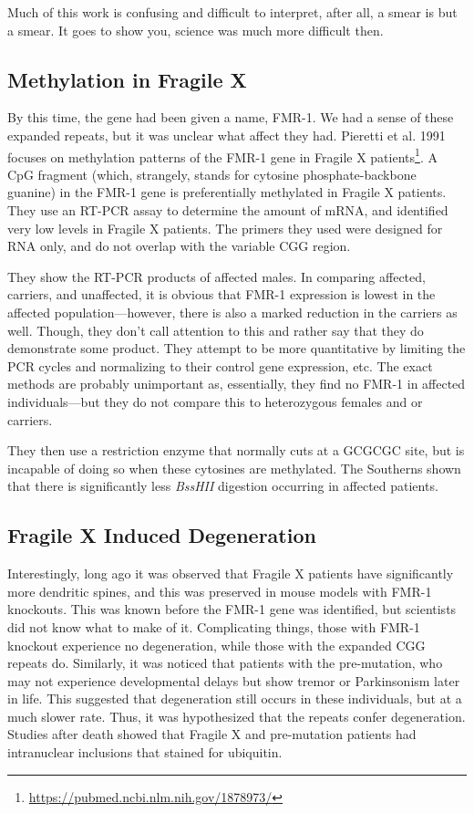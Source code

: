 Much of this work is confusing and difficult to interpret, after all, a smear is but a smear. It goes to show you, science was much more difficult then. 


\subsection*{Methylation in Fragile X}

By this time, the gene had been given a name, FMR-1. We had a sense of these expanded repeats, but it was unclear what affect they had. Pieretti et al. 1991 focuses on methylation patterns of the FMR-1 gene in Fragile X patients\footnote{\url{https://pubmed.ncbi.nlm.nih.gov/1878973/}}. A CpG fragment (which, strangely, stands for cytosine phosphate-backbone guanine) in the FMR-1 gene is preferentially methylated in Fragile X patients. They use an RT-PCR assay to determine the amount of mRNA, and identified very low levels in Fragile X patients. The primers they used were designed for RNA only, and do not overlap with the variable CGG region.\newline

They show the RT-PCR products of affected males. In comparing affected, carriers, and unaffected, it is obvious that FMR-1 expression is lowest in the affected population---however, there is also a marked reduction in the carriers as well. Though, they don't call attention to this and rather say that they do demonstrate some product. They attempt to be more quantitative by limiting the PCR cycles and normalizing to their control gene expression, etc. The exact methods are probably unimportant as, essentially, they find no FMR-1 in affected individuals---but they do not compare this to heterozygous females and or carriers.\newline

They then use a restriction enzyme that normally cuts at a GCGCGC site, but is incapable of doing so when these cytosines are methylated. The Southerns shown that there is significantly less \textit{BssHII} digestion occurring in affected patients. 

\subsection*{Fragile X Induced Degeneration}

Interestingly, long ago it was observed that Fragile X patients have significantly more dendritic spines, and this was preserved in mouse models with FMR-1 knockouts. This was known before the FMR-1 gene was identified, but scientists did not know what to make of it. Complicating things, those with FMR-1 knockout experience no degeneration, while those with the expanded CGG repeats do. Similarly, it was noticed that patients with the pre-mutation, who may not experience developmental delays but show tremor or Parkinsonism later in life. This suggested that degeneration still occurs in these individuals, but at a much slower rate. Thus, it was hypothesized that the repeats confer degeneration. Studies after death showed that Fragile X and pre-mutation patients had intranuclear inclusions that stained for ubiquitin.\newline


